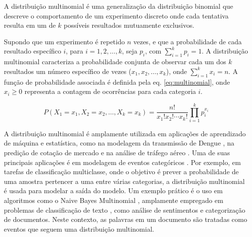A distribuição multinomial \cite{distbook-multinomial} é uma generalização da distribuição binomial \cite{distbook-binomial} que descreve o comportamento de um experimento discreto onde cada tentativa resulta em um de $k$ possíveis resultados mutuamente exclusivos.

Supondo que um experimento é repetido $n$ vezes, e que a probabilidade de cada resultado específico $i$, para $i=1,2,\dots,k$, seja $p_i$, com $\sum_{i=1}^k p_i = 1$. A distribuição multinomial caracteriza a probabilidade conjunta de observar cada um dos $k$ resultados um número específico de vezes ($x_1, x_2,\dots, x_k$), onde $\sum_{i=1}^k x_i = n$. A função de probabilidade associada é definida pela eq. \eqref{eq:multinomial}, onde \( x_i \geq 0 \) representa a contagem de ocorrências para cada categoria \( i \).

\begin{equation}\label{eq:multinomial}
  P(X_1 = x_1, X_2 = x_2, \dots, X_k = x_k) = \frac{n!}{x_1! x_2! \cdots x_k!} \prod_{i=1}^k p_i^{x_i}
\end{equation}

A distribuição multinomial \cite{seber2015-multi} é amplamente utilizada em aplicações de aprendizado de máquina e estatística, como na modelagem da transmissão de Dengue \cite{wang2025}, na predição de cotação de mercado \cite{nevasalmi2020} e na análise de tráfego aéreo \cite{torres2023}. Uma de suas principais aplicações é em modelagem de eventos categóricos \cite{kibriya2004,luo2021}. Por exemplo, em tarefas de classificação multiclasse, onde o objetivo é prever a probabilidade de uma amostra pertencer a uma entre várias categorias, a distribuição multinomial é usada para modelar a saída do modelo. Um exemplo prático é o uso em algoritmos como o Naive Bayes Multinomial \cite{kalcheva2023,jiang2016}, amplamente empregado em problemas de classificação de texto \cite{odeh2022,kan2005}, como análise de sentimentos \cite{saravanan2023} e categorização de documentos. Neste contexto, as palavras em um documento são tratadas como eventos que seguem uma distribuição multinomial.



